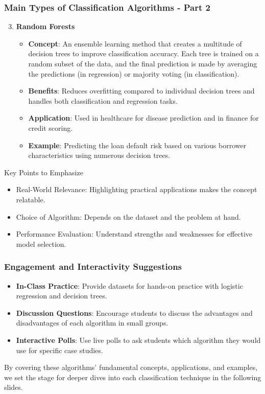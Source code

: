 \documentclass[aspectratio=169]{beamer}
\begin{document}
\begin{frame}[fragile]
    \frametitle{Main Types of Classification Algorithms - Part 2}
    
    \begin{enumerate}
        \setcounter{enumi}{2}
        \item \textbf{Random Forests}
            \begin{itemize}
                \item \textbf{Concept}: An ensemble learning method that creates a multitude of decision trees to improve classification accuracy. Each tree is trained on a random subset of the data, and the final prediction is made by averaging the predictions (in regression) or majority voting (in classification).
                \item \textbf{Benefits}: Reduces overfitting compared to individual decision trees and handles both classification and regression tasks.
                \item \textbf{Application}: Used in healthcare for disease prediction and in finance for credit scoring.
                \item \textbf{Example}: Predicting the loan default risk based on various borrower characteristics using numerous decision trees.
            \end{itemize}
    \end{enumerate}
    
    \begin{block}{Key Points to Emphasize}
        \begin{itemize}
            \item Real-World Relevance: Highlighting practical applications makes the concept relatable.
            \item Choice of Algorithm: Depends on the dataset and the problem at hand.
            \item Performance Evaluation: Understand strengths and weaknesses for effective model selection.
        \end{itemize}
    \end{block}
\end{frame}

\begin{frame}[fragile]
    \frametitle{Engagement and Interactivity Suggestions}
    
    \begin{itemize}
        \item \textbf{In-Class Practice}: Provide datasets for hands-on practice with logistic regression and decision trees.
        \item \textbf{Discussion Questions}: Encourage students to discuss the advantages and disadvantages of each algorithm in small groups.
        \item \textbf{Interactive Polls}: Use live polls to ask students which algorithm they would use for specific case studies.
    \end{itemize}
    
    By covering these algorithms' fundamental concepts, applications, and examples, we set the stage for deeper dives into each classification technique in the following slides.
\end{frame}
\end{document}
